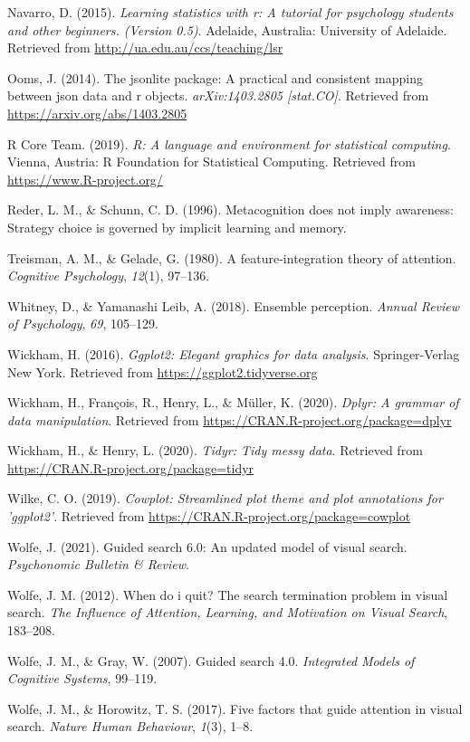 \documentclass[
  english,
  man]{apa6}
\begin{document}
\leavevmode\hypertarget{ref-R-lsr}{}%
Navarro, D. (2015). \emph{Learning statistics with r: A tutorial for psychology students and other beginners. (Version 0.5)}. Adelaide, Australia: University of Adelaide. Retrieved from \url{http://ua.edu.au/ccs/teaching/lsr}

\leavevmode\hypertarget{ref-R-jsonlite}{}%
Ooms, J. (2014). The jsonlite package: A practical and consistent mapping between json data and r objects. \emph{arXiv:1403.2805 {[}stat.CO{]}}. Retrieved from \url{https://arxiv.org/abs/1403.2805}

\leavevmode\hypertarget{ref-R-base}{}%
R Core Team. (2019). \emph{R: A language and environment for statistical computing}. Vienna, Austria: R Foundation for Statistical Computing. Retrieved from \url{https://www.R-project.org/}

\leavevmode\hypertarget{ref-reder1996metacognition}{}%
Reder, L. M., \& Schunn, C. D. (1996). Metacognition does not imply awareness: Strategy choice is governed by implicit learning and memory.

\leavevmode\hypertarget{ref-treisman1980feature}{}%
Treisman, A. M., \& Gelade, G. (1980). A feature-integration theory of attention. \emph{Cognitive Psychology}, \emph{12}(1), 97--136.

\leavevmode\hypertarget{ref-whitney2018ensemble}{}%
Whitney, D., \& Yamanashi Leib, A. (2018). Ensemble perception. \emph{Annual Review of Psychology}, \emph{69}, 105--129.

\leavevmode\hypertarget{ref-R-ggplot2}{}%
Wickham, H. (2016). \emph{Ggplot2: Elegant graphics for data analysis}. Springer-Verlag New York. Retrieved from \url{https://ggplot2.tidyverse.org}

\leavevmode\hypertarget{ref-R-dplyr}{}%
Wickham, H., François, R., Henry, L., \& Müller, K. (2020). \emph{Dplyr: A grammar of data manipulation}. Retrieved from \url{https://CRAN.R-project.org/package=dplyr}

\leavevmode\hypertarget{ref-R-tidyr}{}%
Wickham, H., \& Henry, L. (2020). \emph{Tidyr: Tidy messy data}. Retrieved from \url{https://CRAN.R-project.org/package=tidyr}

\leavevmode\hypertarget{ref-R-cowplot}{}%
Wilke, C. O. (2019). \emph{Cowplot: Streamlined plot theme and plot annotations for 'ggplot2'}. Retrieved from \url{https://CRAN.R-project.org/package=cowplot}

\leavevmode\hypertarget{ref-wolfe2021guided}{}%
Wolfe, J. (2021). Guided search 6.0: An updated model of visual search. \emph{Psychonomic Bulletin \& Review}.

\leavevmode\hypertarget{ref-wolfe2012quit}{}%
Wolfe, J. M. (2012). When do i quit? The search termination problem in visual search. \emph{The Influence of Attention, Learning, and Motivation on Visual Search}, 183--208.

\leavevmode\hypertarget{ref-wolfe2007guided}{}%
Wolfe, J. M., \& Gray, W. (2007). Guided search 4.0. \emph{Integrated Models of Cognitive Systems}, 99--119.

\leavevmode\hypertarget{ref-wolfe2017five}{}%
Wolfe, J. M., \& Horowitz, T. S. (2017). Five factors that guide attention in visual search. \emph{Nature Human Behaviour}, \emph{1}(3), 1--8.

\endgroup
\end{document}
